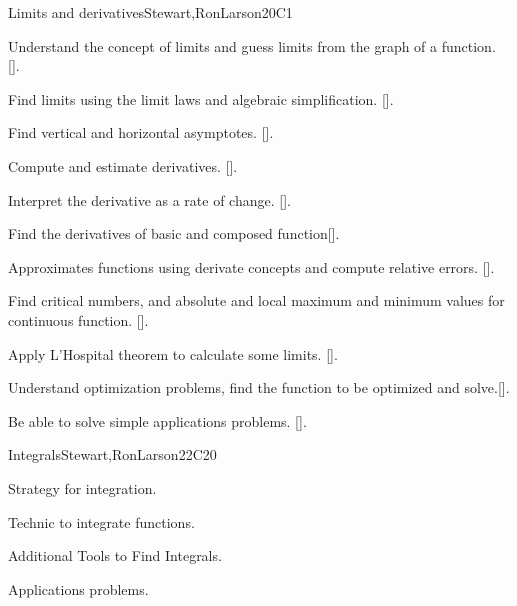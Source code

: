 \begin{syllabus}
\begin{unit}{Limits and derivatives}{}{Stewart,RonLarson}{20}{C1}
   \begin{learningoutcomes}
      \item Understand the concept of limits and guess limits from the graph of a function. [\Assessment].
      \item Find limits using the limit laws and algebraic simplification. [\Assessment].
      \item Find vertical and horizontal asymptotes. [\Assessment].
      \item Compute and estimate derivatives. [\Assessment].
      \item Interpret the derivative as a rate of change. [\Assessment].
      \item Find the derivatives of basic and composed function[\Assessment].
      \item Approximates functions using derivate concepts and compute relative errors. [\Assessment].
      \item Find critical numbers, and absolute and local maximum and minimum values for continuous function. [\Assessment].
      \item Apply L'Hospital theorem to calculate some limits. [\Assessment].
      \item Understand optimization problems, find the function to be optimized and solve.[\Assessment].
      \item Be able to solve simple applications problems. [\Assessment].
   \end{learningoutcomes}
\end{unit}

\begin{unit}{Integrals}{}{Stewart,RonLarson}{22}{C20}
   \begin{topics}
    \item Strategy for integration.
    \item Technic to integrate functions.
    \item Additional Tools to Find Integrals.
    \item Applications problems.
   \end{topics}


\end{unit}
\end{syllabus}
